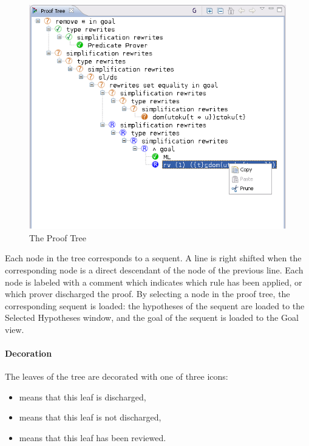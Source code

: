 \begin{figure}[!h]
\begin{center}
	\includegraphics{img/reference/ref_01_proving_perspective2.png}
	\caption{The Proof Tree}
	\label{fig_ref_01_proving_perspective2}
\end{center}
\end{figure}

Each node in the tree corresponds to a sequent. A line is right shifted when the corresponding node is a direct descendant of the node of the previous line. Each node is labeled with a comment which indicates which rule has been applied, or which prover discharged the proof. By selecting a node in the proof tree, the corresponding sequent is loaded: the hypotheses of the sequent are loaded to the \textsf{Selected Hypotheses window}, and the goal of the sequent is loaded to the \textsf{Goal view}.

\paragraph{Decoration}

The leaves of the tree are decorated with one of three icons:

\begin{itemize}
	\item {} means that this leaf is discharged,
	\item {} means that this leaf is not discharged,
	\item {} means that this leaf has been reviewed. 
\end{itemize}

